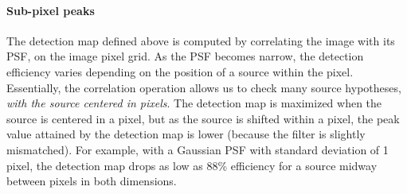 \documentclass[11pt,letterpaper,linenumbers]{aastex63}
\newcommand{\doctype}{paper}
\begin{document}
%














\paragraph{Sub-pixel peaks}  The detection map defined above
is computed by correlating the image with its PSF, on the image pixel
grid.  As the PSF becomes narrow, the detection efficiency varies
depending on the position of a source within the pixel.  Essentially, the
correlation operation allows us to check many source hypotheses, \emph{with
the source centered in pixels}.  The detection
map is maximized when the source is centered in a pixel, but as the source is
shifted within a pixel, the peak value attained by the detection map is
lower (because the filter is slightly mismatched).  For example, with
a Gaussian PSF with standard deviation of 1 pixel, the detection map
drops as low as 88\% efficiency for a source midway between pixels in
both dimensions.
\end{document}
